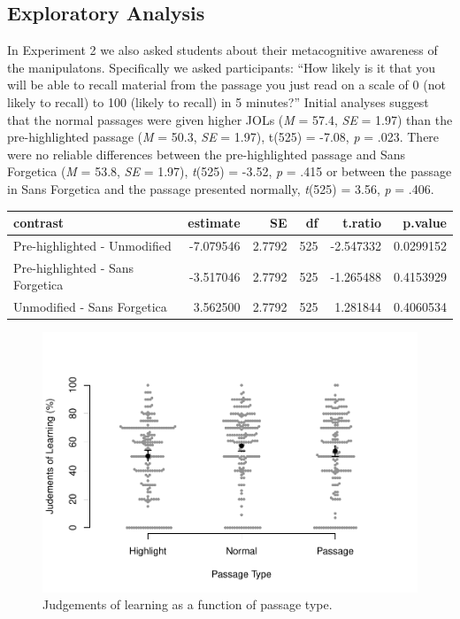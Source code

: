 \documentclass[english,pdf]{apa6}
\begin{document}
\hypertarget{exploratory-analysis}{%
\subsection{Exploratory Analysis}\label{exploratory-analysis}}

In Experiment 2 we also asked students about their metacognitive awareness of the manipulatons. Specifically we asked participants: \enquote{How likely is it that you will be able to recall material from the passage you just read on a scale of 0 (not likely to recall) to 100 (likely to recall) in 5 minutes?} Initial analyses suggest that the normal passages were given higher JOLs (\emph{M} = 57.4, \emph{SE} = 1.97) than the pre-highlighted passage (\emph{M} = 50.3, \emph{SE} = 1.97), t(525) = -7.08, \emph{p} = .023. There were no reliable differences between the pre-highlighted passage and Sans Forgetica (\emph{M} = 53.8, \emph{SE} = 1.97), \emph{t}(525) = -3.52, \emph{p} = .415 or between the passage in Sans Forgetica and the passage presented normally, \emph{t}(525) = 3.56, \emph{p} = .406.

\begin{tabular}{l|r|r|r|r|r}
\hline
contrast & estimate & SE & df & t.ratio & p.value\\
\hline
Pre-highlighted - Unmodified & -7.079546 & 2.7792 & 525 & -2.547332 & 0.0299152\\
\hline
Pre-highlighted - Sans Forgetica & -3.517046 & 2.7792 & 525 & -1.265488 & 0.4153929\\
\hline
Unmodified - Sans Forgetica & 3.562500 & 2.7792 & 525 & 1.281844 & 0.4060534\\
\hline
\end{tabular}

\begin{figure}

{\centering \includegraphics{SF_Paper_files/figure-latex/unnamed-chunk-4-1} 

}

\caption{Judgements of learning as a function of passage type.}\label{fig:unnamed-chunk-4}
\end{figure}
\end{document}
